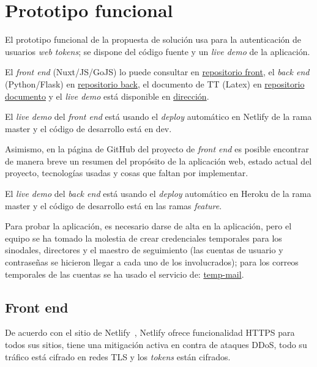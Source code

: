 \section{Prototipo funcional}

El prototipo funcional de la propuesta de solución usa para la autenticación de usuarios \textit{web tokens}; se dispone del código fuente y un \textit{live demo} de la aplicación.


El \textit{front end} (Nuxt/JS/GoJS) lo puede consultar en \href{https://github.com/martinez-acosta/TT-2019-B052}{repositorio front}, el \textit{back end} (Python/Flask) en \href{https://github.com/omaraparicio07/api-tt-2019-b052}{repositorio back}, el documento de TT (Latex) en \href{https://github.com/martinez-acosta/DOCS-TT-2019-B052}{repositorio documento} y el \textit{live demo} está disponible en \href{https://serene-haibt-2239b4.netlify.app/}{dirección}.


El \textit{live demo} del \textit{front end} está usando el \textit{deploy} automático en Netlify de la rama master y el código de desarrollo está en dev.


Asimismo, en la página de GitHub del proyecto de \textit{front end} es posible encontrar de manera breve un resumen del propósito de la aplicación web, estado actual del proyecto, tecnologías usadas y cosas que faltan por implementar.


El \textit{live demo} del \textit{back end} está usando el \textit{deploy} automático en Heroku de la rama master y el código de desarrollo está en las ramas \textit{feature}.


Para probar la aplicación, es necesario darse de alta en la aplicación, pero el equipo se ha tomado la molestia de crear credenciales temporales para los sinodales, directores y el maestro de seguimiento (las cuentas de usuario y contraseñas se hicieron llegar a cada uno de los involucrados); para los correos temporales de las cuentas se ha usado el servicio de: \href{https://temp-mail.org/es/}{temp-mail}.

\subsection*{Front end}

De acuerdo con el sitio de Netlify~\cite{netlify_netlify_nodate}, Netlify ofrece funcionalidad HTTPS para todos sus sitios, tiene una mitigación activa en contra de ataques DDoS, todo su tráfico está cifrado en redes TLS y los \textit{tokens} están cifrados.

